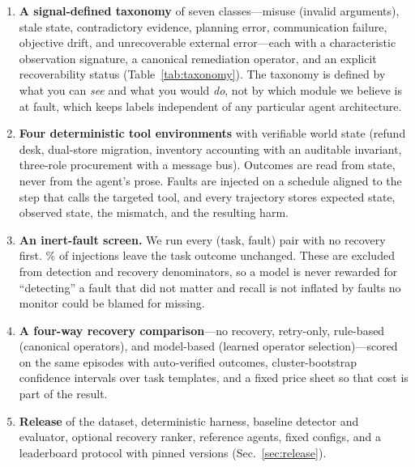 \begin{enumerate}[leftmargin=1.4em]
\item \textbf{A signal-defined taxonomy} of seven classes---misuse (invalid arguments), stale state,
contradictory evidence, planning error, communication failure, objective drift, and unrecoverable
external error---each with a characteristic observation signature, a canonical remediation operator,
and an explicit recoverability status (Table~\ref{tab:taxonomy}). The taxonomy is defined by what
you can \emph{see} and what you would \emph{do}, not by which module we believe is at fault, which
keeps labels independent of any particular agent architecture.

\item \textbf{Four deterministic tool environments} with verifiable world state (refund desk,
dual-store migration, inventory accounting with an auditable invariant, three-role procurement with
a message bus). Outcomes are read from state, never from the agent's prose. Faults are injected on a
schedule aligned to the step that calls the targeted tool, and every trajectory stores expected
state, observed state, the mismatch, and the resulting harm.

\item \textbf{An inert-fault screen.} We run every (task, fault) pair with no recovery first.
\InertPct\% of injections leave the task outcome unchanged. These are excluded from detection and
recovery denominators, so a model is never rewarded for ``detecting'' a fault that did not matter
and recall is not inflated by faults no monitor could be blamed for missing.

\item \textbf{A four-way recovery comparison}---no recovery, retry-only, rule-based (canonical
operators), and model-based (learned operator selection)---scored on the same episodes with
auto-verified outcomes, cluster-bootstrap confidence intervals over task templates, and a fixed
price sheet so that cost is part of the result.

\item \textbf{Release} of the dataset, deterministic harness, baseline detector and evaluator,
optional recovery ranker, reference agents, fixed configs, and a leaderboard protocol with pinned
versions (Sec.~\ref{sec:release}).
\end{enumerate}

